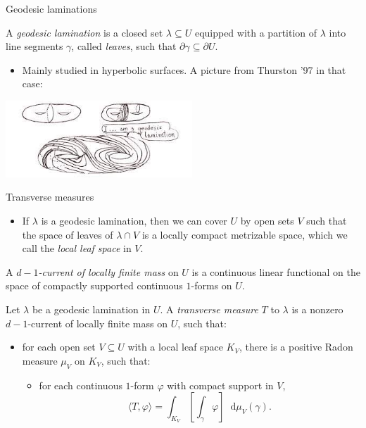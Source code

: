 \documentclass[10pt]{beamer}
\newcommand*\dif{\mathop{}\!\mathrm{d}}
\begin{document}
\begin{frame}{Geodesic laminations}
\begin{definition}
A \emph{geodesic lamination} is a closed set $\lambda \subseteq U$ equipped with a partition of $\lambda$ into line segments $\gamma$, called \emph{leaves}, such that $\partial \gamma \subseteq \partial U$.
\end{definition}

\begin{itemize}
\item Mainly studied in hyperbolic surfaces. A picture from Thurston '97 in that case:
\end{itemize}

\centering 
\includegraphics[width=7cm]{GeodesicLamination.jpg}
    
\end{frame}

\begin{frame}{Transverse measures}
\begin{itemize}
\item If $\lambda$ is a geodesic lamination, then we can cover $U$ by open sets $V$ such that the space of leaves of $\lambda \cap V$ is a locally compact metrizable space, which we call the \emph{local leaf space} in $V$. \pause
\end{itemize}

\begin{definition}
A \emph{$d - 1$-current of locally finite mass} on $U$ is a continuous linear functional on the space of compactly supported continuous $1$-forms on $U$. \pause
\end{definition}

\begin{definition}
Let $\lambda$ be a geodesic lamination in $U$.
A \emph{transverse measure} $T$ to $\lambda$ is a nonzero $d - 1$-current of locally finite mass on $U$, such that: \pause
\begin{itemize}
\item for each open set $V \subseteq U$ with a local leaf space $K_V$, there is a positive Radon measure $\mu_V$ on $K_V$, such that:
\begin{itemize}
\item for each continuous $1$-form $\varphi$ with compact support in $V$,
$$\langle T, \varphi\rangle = \int_{K_V} \left[\int_\gamma \varphi\right] \dif \mu_V(\gamma).$$
\end{itemize}
\end{itemize}
\end{definition}
\end{frame}
\end{document}
